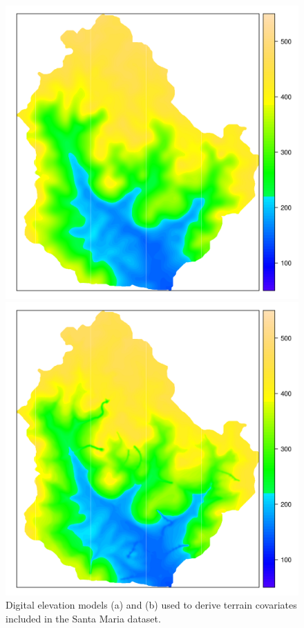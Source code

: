 \begin{figure}[!ht]
\centering
\begin{minipage}[b]{63mm}
\subcaption{}
\centering
\includegraphics{fig/chap05-dem-old}
\end{minipage}
\begin{minipage}[b]{63mm}
\subcaption{}
\centering
\includegraphics{fig/chap05-dem-new}
\end{minipage} 
\caption[Digital elevation models included in the Santa Maria dataset.]{Digital elevation models (a) \demOld{} 
and (b) \demNew{} used to derive terrain covariates included in the Santa Maria dataset.}
\label{fig:chap05-dem}
\end{figure}

